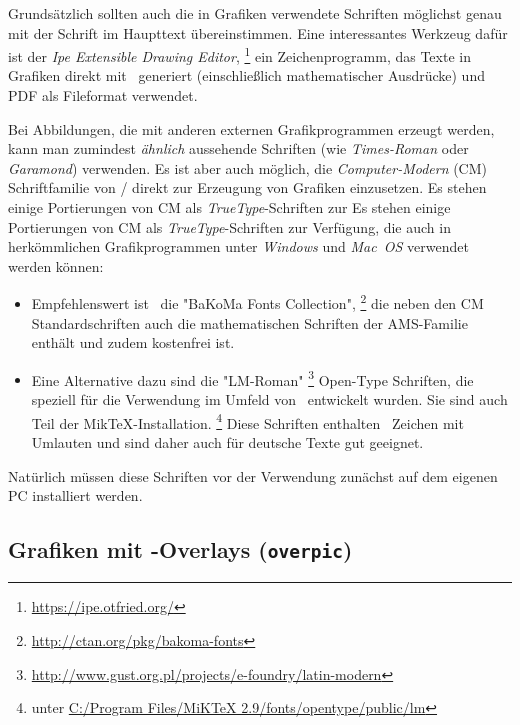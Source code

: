 Grundsätzlich sollten auch die in Grafiken verwendete Schriften möglichst genau
mit der Schrift im Haupttext übereinstimmen. Eine interessantes Werkzeug dafür
ist der \emph{Ipe Extensible Drawing Editor},%
\footnote{\url{https://ipe.otfried.org/}}
ein Zeichenprogramm, das Texte in Grafiken direkt mit \latex\ generiert
(einschließlich mathematischer Ausdrücke) und PDF als Fileformat verwendet.

Bei Abbildungen, die mit anderen externen Grafikprogrammen erzeugt werden, kann
man zumindest \emph{ähnlich} aussehende Schriften (wie \emph{Times-Roman} oder
\emph{Garamond}) verwenden. Es ist aber auch möglich, die 
\emph{Computer-Modern} (CM) Schriftfamilie von {\tex}/{\latex} direkt
zur Erzeugung von Grafiken einzusetzen.
Es stehen einige Portierungen von CM als \emph{TrueType}-Schriften zur
Es stehen einige Portierungen von CM als \emph{TrueType}-Schriften zur
Verfügung, die auch in herkömmlichen Grafikprogrammen unter \emph{Windows}
und \emph{Mac~OS} verwendet werden können:
%
\begin{itemize}
\item	%
Empfehlenswert ist \zB\ die "BaKoMa Fonts Collection",%
\footnote{\url{http://ctan.org/pkg/bakoma-fonts}}
die neben den CM Standardschriften auch die mathematischen Schriften der
AMS-Familie ent\-hält und zudem kostenfrei ist. 
\item	%
Eine Alternative dazu sind die "LM-Roman"%
\footnote{\url{http://www.gust.org.pl/projects/e-foundry/latin-modern}}
Open-Type Schriften, die speziell für die Verwendung im Umfeld von \latex\
entwickelt wurden. Sie sind auch Teil der MikTeX-Installation.%
\footnote{\zB unter \url{C:/Program Files/MiKTeX 2.9/fonts/opentype/public/lm}}
Diese Schriften enthalten \ua\ Zeichen mit Umlauten und sind daher auch für 
deutsche Texte gut geeignet.
\end{itemize}
%
Natürlich müssen diese Schriften vor der Verwendung zunächst auf dem eigenen PC
installiert werden.

\subsection{Grafiken mit \latex-Overlays (\texttt{overpic})}
\label{sec:GraphicOverlays}

